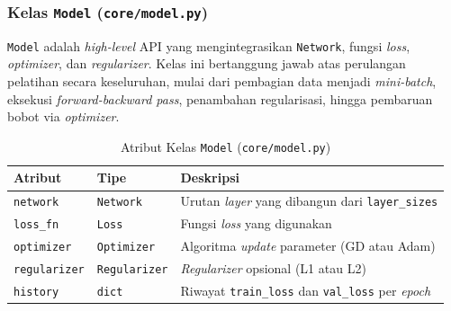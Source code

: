 \subsubsection{Kelas \texttt{Model} (\texttt{core/model.py})}

\texttt{Model} adalah \textit{high-level} API yang mengintegrasikan \texttt{Network}, fungsi \textit{loss}, \textit{optimizer}, dan \textit{regularizer}. Kelas ini bertanggung jawab atas perulangan pelatihan secara keseluruhan, mulai dari pembagian data menjadi \textit{mini-batch}, eksekusi \textit{forward-backward pass}, penambahan regularisasi, hingga pembaruan bobot via \textit{optimizer}.

\begin{table}[H]
    \centering
    \caption{Atribut Kelas \texttt{Model} (\texttt{core/model.py})}
    \begin{tabular}{lll}
        \toprule
        \textbf{Atribut} & \textbf{Tipe} & \textbf{Deskripsi} \\
        \midrule
        \texttt{network} & \texttt{Network} & Urutan \textit{layer} yang dibangun dari \texttt{layer\_sizes} \\
        \texttt{loss\_fn} & \texttt{Loss} & Fungsi \textit{loss} yang digunakan \\
        \texttt{optimizer} & \texttt{Optimizer} & Algoritma \textit{update} parameter (GD atau Adam) \\
        \texttt{regularizer} & \texttt{Regularizer} & \textit{Regularizer} opsional (L1 atau L2) \\
        \texttt{history} & \texttt{dict} & Riwayat \texttt{train\_loss} dan \texttt{val\_loss} per \textit{epoch} \\
        \bottomrule
    \end{tabular}
    \label{tab:model-attr}
\end{table}


